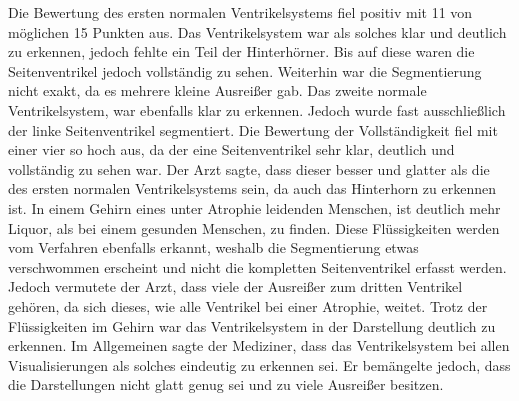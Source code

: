 Die Bewertung des ersten normalen Ventrikelsystems fiel positiv mit 11 von möglichen 15 Punkten aus. Das Ventrikelsystem war als solches klar und deutlich zu erkennen, jedoch fehlte ein Teil der Hinterhörner. Bis auf diese waren die Seitenventrikel jedoch vollständig zu sehen. Weiterhin war die Segmentierung nicht exakt, da es mehrere kleine Ausreißer gab.
\newline
Das zweite normale Ventrikelsystem, war ebenfalls klar zu erkennen. Jedoch wurde fast ausschließlich der linke Seitenventrikel segmentiert. Die Bewertung der Vollständigkeit fiel mit einer vier so hoch aus, da der eine Seitenventrikel sehr klar, deutlich und vollständig zu sehen war. Der Arzt sagte, dass dieser besser und glatter als die des ersten normalen Ventrikelsystems sein, da auch das Hinterhorn zu erkennen ist. 
\newline
In einem Gehirn eines unter Atrophie leidenden Menschen, ist deutlich mehr Liquor, als bei einem gesunden Menschen, zu finden. Diese Flüssigkeiten werden vom Verfahren ebenfalls erkannt, weshalb die Segmentierung etwas verschwommen erscheint und nicht die kompletten Seitenventrikel erfasst werden. Jedoch vermutete der Arzt, dass viele der Ausreißer zum dritten Ventrikel gehören, da sich dieses, wie alle Ventrikel bei einer Atrophie, weitet. Trotz der Flüssigkeiten im Gehirn war das Ventrikelsystem in der Darstellung deutlich zu erkennen.
\newline
 Im Allgemeinen sagte der Mediziner, dass das Ventrikelsystem bei allen Visualisierungen als solches eindeutig zu erkennen sei. Er bemängelte jedoch, dass die Darstellungen nicht glatt genug sei und zu viele Ausreißer besitzen.


